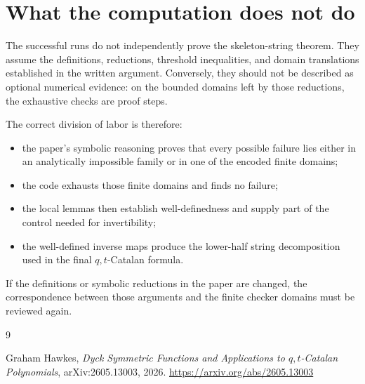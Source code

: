 \documentclass{article}
\begin{document}
\section{What the computation does not do}

The successful runs do not independently prove the skeleton-string theorem.
They assume the definitions, reductions, threshold inequalities, and domain
translations established in the written argument.  Conversely, they should
not be described as optional numerical evidence: on the bounded domains left
by those reductions, the exhaustive checks are proof steps.

The correct division of labor is therefore:
\begin{itemize}
\item the paper's symbolic reasoning proves that every possible failure lies
      either in an analytically impossible family or in one of the encoded
      finite domains;
\item the code exhausts those finite domains and finds no failure;
\item the local lemmas then establish well-definedness and supply part of the
      control needed for invertibility;
\item the well-defined inverse maps produce the lower-half string
      decomposition used in the final $q,t$-Catalan formula.
\end{itemize}
If the definitions or symbolic reductions in the paper are changed, the
correspondence between those arguments and the finite checker domains must be
reviewed again.

\begin{thebibliography}{9}

Graham Hawkes,
\emph{Dyck Symmetric Functions and Applications to $q,t$-Catalan Polynomials},
arXiv:2605.13003, 2026.
\url{https://arxiv.org/abs/2605.13003}

\end{thebibliography}
\end{document}
